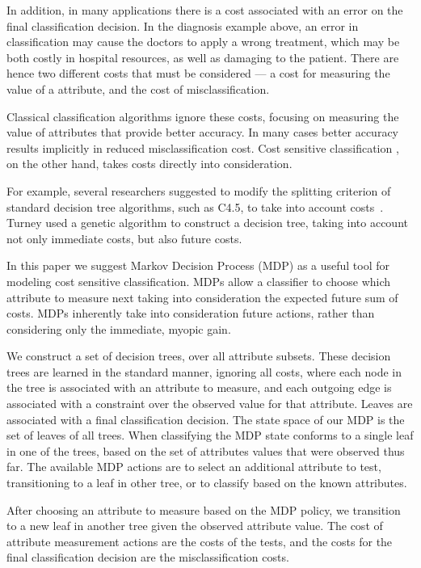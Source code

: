 \documentclass[letterpaper]{article}
\theoremstyle{definition}
\begin{document}
In addition, in many applications there is a cost associated with an error on the final classification decision. In the diagnosis example above, an error in classification may cause the doctors to apply a wrong treatment, which may be both costly in hospital resources, as well as damaging to the patient. There are hence two different costs that must be considered ---  a cost for measuring the value of a attribute, and the cost of misclassification. 

Classical classification algorithms ignore these costs, focusing on measuring the value of attributes that provide better accuracy. In many cases better accuracy results implicitly in reduced misclassification cost.
Cost sensitive classification \cite{elkan2001foundations,turney1995cost,LomaxV13}, on the other hand, takes costs directly into consideration.

For example, several researchers suggested to modify the splitting criterion of standard decision tree algorithms, such as C4.5, to take into account costs~\cite{CS-IDS3,IDX,EG2}. Turney  used a genetic algorithm to construct a decision tree, taking into account not only immediate costs, but also future costs. 

In this paper we suggest Markov Decision Process (MDP) \cite{Bellman,Puterman} as a useful tool for modeling cost sensitive classification. MDPs allow a classifier to choose which attribute to measure next taking into consideration the expected future sum of costs. MDPs inherently take into consideration future actions, rather than considering only the immediate, myopic gain.

We construct a set of decision trees, over all attribute subsets. These decision trees are learned in the standard manner, ignoring all costs, where each node in the tree is associated with an attribute to measure, and each outgoing edge is associated with a constraint over the observed value for that attribute. Leaves are associated with a final classification decision. The state space of our MDP is the set of leaves of all trees.
When classifying the MDP state conforms to a single leaf in one of the trees, based on the set of attributes values that were observed thus far.
The available MDP actions are to select an additional attribute to test, transitioning to a leaf in other tree, or to classify based on the known attributes. 

After choosing an attribute to measure based on the MDP policy, we transition to a new leaf in another tree given the observed attribute value. The cost of attribute measurement actions are the costs of the tests, and the costs for the final classification decision are the misclassification costs.
\end{document}
